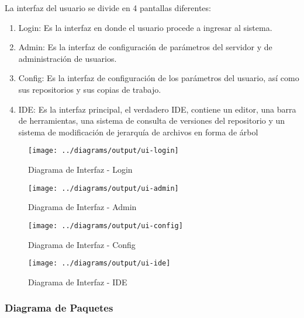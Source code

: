 La interfaz del usuario se divide en 4 pantallas diferentes:

\begin{enumerate}

	\item Login: Es la interfaz en donde el usuario procede a ingresar al sistema.
	
	\item Admin: Es la interfaz de configuración de parámetros del servidor y de administración de usuarios.
	
	\item Config: Es la interfaz de configuración de los parámetros del usuario, así como sus repositorios y sus copias de trabajo.
	
	\item IDE: Es la interfaz principal, el verdadero IDE, contiene un editor, una barra de herramientas, una sistema de consulta de versiones del repositorio y un sistema de modificación de jerarquía de archivos en forma de árbol

\end{enumerate}

\begin{landscape}
\begin{figure}
 \centering
 \texttt{[image: ../diagrams/output/ui-login]}
 \caption{Diagrama de Interfaz - Login}
 \label{diagrama:ui-login}
\end{figure}
\end{landscape}

\begin{figure}
 \centering
 \texttt{[image: ../diagrams/output/ui-admin]}
 \caption{Diagrama de Interfaz - Admin}
 \label{diagrama:ui-admin}
\end{figure}

\begin{figure}
 \centering
 \texttt{[image: ../diagrams/output/ui-config]}
 \caption{Diagrama de Interfaz - Config}
 \label{diagrama:ui-config}
\end{figure}

\begin{landscape}
\begin{figure}
 \centering
 \texttt{[image: ../diagrams/output/ui-ide]}
 \caption{Diagrama de Interfaz - IDE}
 \label{diagrama:ui-ide}
\end{figure}
\end{landscape}


\subsubsection{Diagrama de Paquetes}

